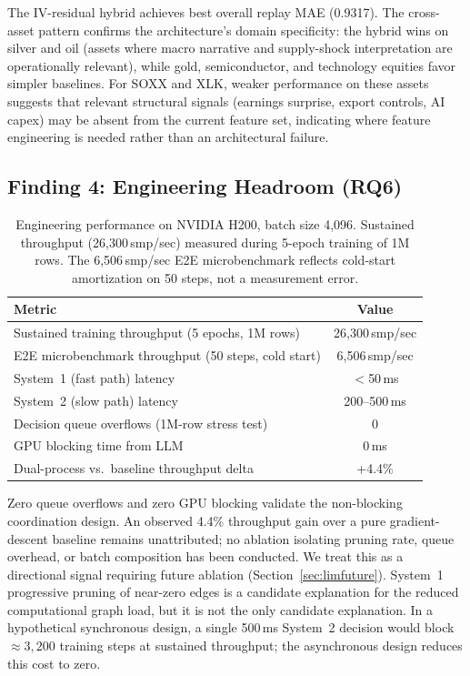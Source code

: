 \documentclass[11pt,a4paper]{article}
\begin{document}
The IV-residual hybrid achieves best overall replay MAE (0.9317). The cross-asset
pattern confirms the architecture's domain specificity: the hybrid wins on silver and
oil (assets where macro narrative and supply-shock interpretation are operationally
relevant), while gold, semiconductor, and technology equities favor simpler baselines.
For SOXX and XLK, weaker performance on these assets suggests that relevant structural
signals (earnings surprise, export controls, AI capex) may be absent from the current
feature set, indicating where feature engineering is needed rather than an architectural
failure.

\subsection{Finding 4: Engineering Headroom (RQ6)}
\label{sec:experiments:headroom}

\begin{table}[ht]
\centering
\caption{Engineering performance on NVIDIA H200, batch size 4,096. Sustained
throughput (26,300\,smp/sec) measured during 5-epoch training of 1M rows. The
6,506\,smp/sec E2E microbenchmark reflects cold-start amortization on 50 steps, not
a measurement error.}
\begin{tabular}{@{}lc@{}}
\toprule
Metric & Value \\ \midrule
Sustained training throughput (5 epochs, 1M rows) & 26,300\,smp/sec \\
E2E microbenchmark throughput (50 steps, cold start) & 6,506\,smp/sec \\
System~1 (fast path) latency & $<$50\,ms \\
System~2 (slow path) latency & 200--500\,ms \\
Decision queue overflows (1M-row stress test) & 0 \\
GPU blocking time from LLM & 0\,ms \\
Dual-process vs.\ baseline throughput delta & +4.4\% \\
\bottomrule
\end{tabular}
\label{tab:engineering}
\end{table}

Zero queue overflows and zero GPU blocking validate the non-blocking coordination
design. An observed 4.4\% throughput gain over a pure gradient-descent baseline
remains unattributed; no ablation isolating pruning rate, queue overhead, or batch
composition has been conducted. We treat this as a directional signal requiring future
ablation (Section~\ref{sec:limfuture}). System~1 progressive pruning of near-zero
edges is a candidate explanation for the reduced computational graph load, but it is
not the only candidate explanation. In a hypothetical synchronous design, a single
500\,ms System~2 decision would block $\approx 3{,}200$ training steps at sustained
throughput; the asynchronous design reduces this cost to zero.
\end{document}
